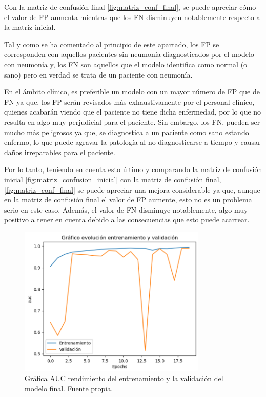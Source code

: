 Con la matriz de confusión final \ref{fig:matriz_conf_final}, se puede apreciar cómo el valor de FP aumenta mientras que los FN disminuyen notablemente respecto a la matriz inicial. 

Tal y como se ha comentado al principio de este apartado, los FP se corresponden con aquellos pacientes sin neumonía diagnosticados por el modelo con neumonía y, los FN son aquellos que el modelo identifica como normal (o sano) pero en verdad se trata de un paciente con neumonía.

En el ámbito clínico, es preferible un modelo con un mayor número de FP que de FN ya que, los FP serán revisados más exhaustivamente por el personal clínico, quienes acabarán viendo que el paciente no tiene dicha enfermedad, por lo que no resulta en algo muy perjudicial para el paciente. Sin embargo, los FN, pueden ser mucho más peligrosos ya que, se diagnostica a un paciente como sano estando enfermo, lo que puede agravar la patología al no diagnosticarse a tiempo y causar daños irreparables para el paciente.

Por lo tanto, teniendo en cuenta esto último y comparando la matriz de confusión inicial \ref{fig:matriz_confusion_inicial} con la matriz de confusión final, \ref{fig:matriz_conf_final} se puede apreciar una mejora considerable ya que, aunque en la matriz de confusión final el valor de FP aumente, esto no es un problema serio en este caso. Además, el valor de FN disminuye notablemente, algo muy positivo a tener en cuenta debido a las consecuencias que esto puede acarrear.


\begin{figure}[h]
    \centering
    \includegraphics[width=0.80\textwidth]{img/grafica_auc_Simple3_64_100_16.PNG}
    \caption{Gráfica AUC rendimiento del entrenamiento y la validación del modelo final. Fuente propia.}
    \label{fig:grafica_auc_Simple3_64_100_16}
\end{figure}
\FloatBarrier

